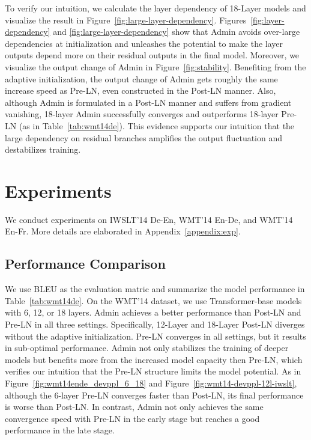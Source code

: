 \documentclass[11pt,a4paper]{article}
\newcommand{\our}{\mbox{Admin}\xspace}
\begin{document}
To verify our intuition, we calculate the layer dependency of 18-Layer models and visualize the result in Figure~\ref{fig:large-layer-dependency}. 
Figures~\ref{fig:layer-dependency} and \ref{fig:large-layer-dependency}
show that \our avoids over-large dependencies at initialization and unleashes the potential to make the layer outputs depend more on their residual outputs in the final model. 
Moreover, we visualize the output change of \our in Figure~\ref{fig:stability}. 
Benefiting from the adaptive initialization, the output change of \our gets roughly the same increase speed as Pre-LN, even constructed in the Post-LN manner. 
Also, although \our is formulated in a Post-LN manner and suffers from gradient vanishing, 18-layer \our successfully converges and outperforms 18-layer Pre-LN (as in Table~\ref{tab:wmt14de}). 
This evidence supports our intuition that the large dependency on residual branches amplifies the output fluctuation and destabilizes training. 
 

\section{Experiments}

We conduct experiments on 
IWSLT'14 De-En, WMT'14 En-De, and WMT'14 En-Fr. 
More details are elaborated in Appendix~\ref{appendix:exp}. 

\subsection{Performance Comparison}

We use BLEU as the evaluation matric and summarize the model performance in Table~\ref{tab:wmt14de}. 
On the WMT'14 dataset, we use Transformer-base models with 6, 12, or 18 layers. 
\our achieves a better performance than Post-LN and Pre-LN in all three settings. 
Specifically, 12-Layer and 18-Layer Post-LN diverges without the adaptive initialization.
Pre-LN converges in all settings, but it results in sub-optimal performance. 
Admin not only stabilizes the training of deeper models but benefits more from the increased model capacity then Pre-LN, which verifies our intuition that the Pre-LN structure limits the model potential. 
As in Figure~\ref{fig:wmt14ende_devppl_6_18} and Figure~\ref{fig:wmt14-devppl-12l-iwslt}, although the 6-layer Pre-LN converges faster than Post-LN, its final performance is worse than Post-LN. 
In contrast, \our not only achieves the same convergence speed with Pre-LN in the early stage but reaches a good performance in the late stage. 
\end{document}
